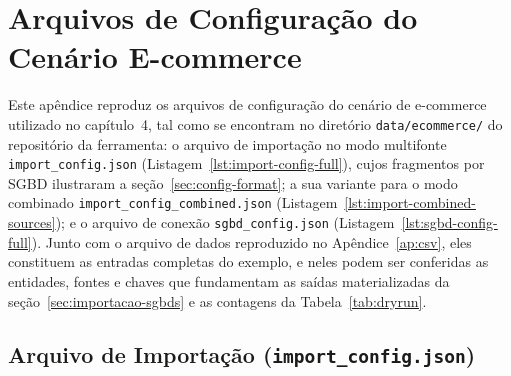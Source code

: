 \chapter{Arquivos de Configuração do Cenário E-commerce}
\label{ap:config}

Este apêndice reproduz os arquivos de configuração do cenário de e-commerce utilizado no
capítulo~4, tal como se encontram no diretório \texttt{data/ecommerce/} do repositório da
ferramenta: o arquivo de importação no modo multifonte \texttt{import\_config.json}
(Listagem~\ref{lst:import-config-full}), cujos fragmentos por SGBD ilustraram a
seção~\ref{sec:config-format}; a sua variante para o modo combinado
\texttt{import\_config\_combined.json} (Listagem~\ref{lst:import-combined-sources}); e o
arquivo de conexão \texttt{sgbd\_config.json} (Listagem~\ref{lst:sgbd-config-full}). Junto
com o arquivo de dados reproduzido no Apêndice~\ref{ap:csv}, eles constituem as entradas
completas do exemplo, e neles podem ser conferidas as entidades, fontes e chaves que
fundamentam as saídas materializadas da seção~\ref{sec:importacao-sgbds} e as contagens
da Tabela~\ref{tab:dryrun}.

\section{Arquivo de Importação (\texttt{import\_config.json})}

